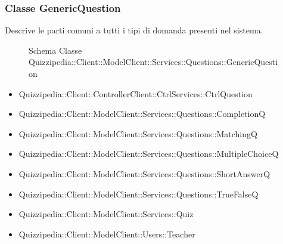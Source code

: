\subsubsection{Classe GenericQuestion}
Descrive le parti comuni a tutti i tipi di domanda presenti nel sistema.
\begin{figure}[H]
\centering
\noindent{}
\caption[Schema Classe GenericQuestion]{Schema Classe Quizzipedia::Client::ModelClient::Services::Questions::GenericQuestion}
\end{figure}
\begin{itemize}
\item Quizzipedia::Client::ControllerClient::CtrlServices::CtrlQuestion
\item Quizzipedia::Client::ModelClient::Services::Questions::CompletionQ
\item Quizzipedia::Client::ModelClient::Services::Questions::MatchingQ
\item Quizzipedia::Client::ModelClient::Services::Questions::MultipleChoiceQ
\item Quizzipedia::Client::ModelClient::Services::Questions::ShortAnswerQ
\item Quizzipedia::Client::ModelClient::Services::Questions::TrueFalseQ
\item Quizzipedia::Client::ModelClient::Services::Quiz
\item Quizzipedia::Client::ModelClient::Users::Teacher
\end{itemize}
